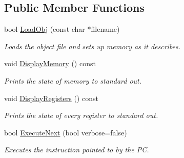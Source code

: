 \subsection*{Public Member Functions}
\begin{DoxyCompactItemize}
\item 
bool \hyperlink{classWi11_a1bd83a38f0ae1ff1436c98e73ff8b421}{LoadObj} (const char $\ast$filename)
\begin{DoxyCompactList}\small\item\em Loads the object file and sets up memory as it describes. \item\end{DoxyCompactList}\item 
void \hyperlink{classWi11_a0f532cefdebd3c33ddc93e8bce4dc06b}{DisplayMemory} () const 
\begin{DoxyCompactList}\small\item\em Prints the state of memory to standard out. \item\end{DoxyCompactList}\item 
void \hyperlink{classWi11_a201359b2506539dda72075b908076492}{DisplayRegisters} () const 
\begin{DoxyCompactList}\small\item\em Prints the state of every register to standard out. \item\end{DoxyCompactList}\item 
bool \hyperlink{classWi11_ace44826e4f92aabd233b68bdd9437c1b}{ExecuteNext} (bool verbose=false)
\begin{DoxyCompactList}\small\item\em Executes the instruction pointed to by the PC. \item\end{DoxyCompactList}\end{DoxyCompactItemize}
